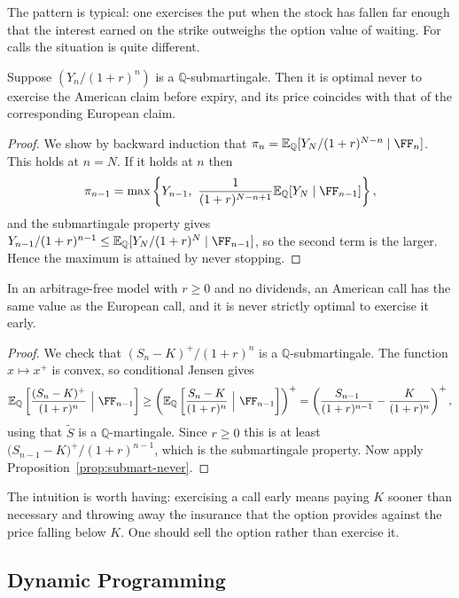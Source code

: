 \documentclass[a4paper]{scrartcl}
\newcommand{\QQ}{\mathbb{Q}}
\begin{document}
The pattern is typical: one exercises the put when the stock has fallen far enough that the interest earned on the strike outweighs the option value of waiting. For calls the situation is quite different.

\begin{proposition}\label{prop:submart-never}
	Suppose $(Y_n/(1+r)^n)$ is a $\QQ$-submartingale. Then it is optimal never to exercise the American claim before expiry, and its price coincides with that of the corresponding European claim.
\end{proposition}

\begin{proof}
	We show by backward induction that $\pi_n = \EE_\QQ[Y_N/(1+r)^{N-n}\mid\FF_n]$. This holds at $n = N$. If it holds at $n$ then
	$$
	\pi_{n-1} = \max\left\{Y_{n-1},\ \frac{1}{(1+r)^{N-n+1}}\EE_\QQ[Y_N\mid\FF_{n-1}]\right\},
	$$
	and the submartingale property gives $Y_{n-1}/(1+r)^{n-1}\leq \EE_\QQ[Y_N/(1+r)^N\mid\FF_{n-1}]$, so the second term is the larger. Hence the maximum is attained by never stopping.
\end{proof}

\begin{corollary}
	In an arbitrage-free model with $r \geq 0$ and no dividends, an American call has the same value as the European call, and it is never strictly optimal to exercise it early.
\end{corollary}

\begin{proof}
	We check that $(S_n - K)^+/(1+r)^n$ is a $\QQ$-submartingale. The function $x \mapsto x^+$ is convex, so conditional Jensen gives
	$$
	\EE_\QQ\left[\frac{(S_n-K)^+}{(1+r)^n}\ \Big|\ \FF_{n-1}\right] \geq \left(\EE_\QQ\left[\frac{S_n - K}{(1+r)^n}\ \Big|\ \FF_{n-1}\right]\right)^+ = \left(\frac{S_{n-1}}{(1+r)^{n-1}} - \frac{K}{(1+r)^n}\right)^+,
	$$
	using that $\tilde S$ is a $\QQ$-martingale. Since $r\geq 0$ this is at least $\big(S_{n-1}-K\big)^+/(1+r)^{n-1}$, which is the submartingale property. Now apply Proposition~\ref{prop:submart-never}.
\end{proof}

The intuition is worth having: exercising a call early means paying $K$ sooner than necessary and throwing away the insurance that the option provides against the price falling below $K$. One should sell the option rather than exercise it.

\subsection{Dynamic Programming}
\end{document}
